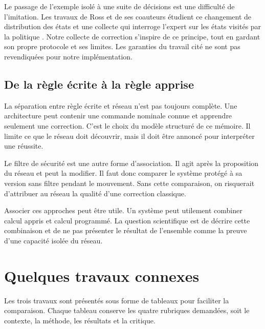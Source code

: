 Le passage de l'exemple isolé à une suite de décisions est une difficulté de l'imitation. Les travaux de Ross et de ses coauteurs étudient ce changement de distribution des états et une collecte qui interroge l'expert sur les états visités par la politique \cite{ross2011}. Notre collecte de correction s'inspire de ce principe, tout en gardant son propre protocole et ses limites. Les garanties du travail cité ne sont pas revendiquées pour notre implémentation.

\subsection{De la règle écrite à la règle apprise}
La séparation entre règle écrite et réseau n'est pas toujours complète. Une architecture peut contenir une commande nominale connue et apprendre seulement une correction. C'est le choix du modèle structuré de ce mémoire. Il limite ce que le réseau doit découvrir, mais il doit être annoncé pour interpréter une réussite.

Le filtre de sécurité est une autre forme d'association. Il agit après la proposition du réseau et peut la modifier. Il faut donc comparer le système protégé à sa version sans filtre pendant le mouvement. Sans cette comparaison, on risquerait d'attribuer au réseau la qualité d'une correction classique.

Associer ces approches peut être utile. Un système peut utilement combiner calcul appris et calcul programmé. La question scientifique est de décrire cette combinaison et de ne pas présenter le résultat de l'ensemble comme la preuve d'une capacité isolée du réseau.

\section{Quelques travaux connexes}
Les trois travaux sont présentés sous forme de tableaux pour faciliter la comparaison. Chaque tableau conserve les quatre rubriques demandées, soit le contexte, la méthode, les résultats et la critique.

